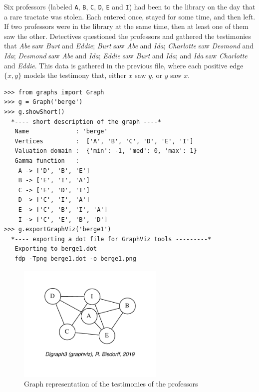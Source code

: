 Six professors (labeled \texttt{A}, \texttt{B}, \texttt{C}, \texttt{D}, \texttt{E} and \texttt{I}) had been to the library on the day that a rare tractate was stolen. Each entered once, stayed for some time, and then left. If two professors were in the library at the same time, then at least one of them saw the other. Detectives questioned the professors and gathered the testimonies that \emph{Abe} saw \emph{Burt} and \emph{Eddie}; \emph{Burt} saw \emph{Abe} and \emph{Ida}; \emph{Charlotte} saw \emph{Desmond} and \emph{Ida}; \emph{Desmond} saw \emph{Abe} and \emph{Ida}; \emph{Eddie} saw \emph{Burt} and \emph{Ida}; and \emph{Ida} saw \emph{Charlotte} and \emph{Eddie}. This data is gathered in the previous file, where each positive edge $\{x,y\}$ models the testimony that, either $x$ saw $y$, or $y$ saw $x$.
\begin{lstlisting}
>>> from graphs import Graph
>>> g = Graph('berge')
>>> g.showShort()
  *---- short description of the graph ----*
   Name             : 'berge'
   Vertices         :  ['A', 'B', 'C', 'D', 'E', 'I']
   Valuation domain :  {'min': -1, 'med': 0, 'max': 1}
   Gamma function   : 
    A -> ['D', 'B', 'E']
    B -> ['E', 'I', 'A']
    C -> ['E', 'D', 'I']
    D -> ['C', 'I', 'A']
    E -> ['C', 'B', 'I', 'A']
    I -> ['C', 'E', 'B', 'D']
>>> g.exportGraphViz('berge1')
  *---- exporting a dot file for GraphViz tools ---------*
   Exporting to berge1.dot
   fdp -Tpng berge1.dot -o berge1.png
\end{lstlisting}
\begin{figure}[ht]
\sidecaption[t]
\includegraphics[width=7cm]{Figures/23-2-berge1.pdf}
\caption{Graph representation of the testimonies of the professors} 
\label{fig:23.2}       %
\end{figure}

